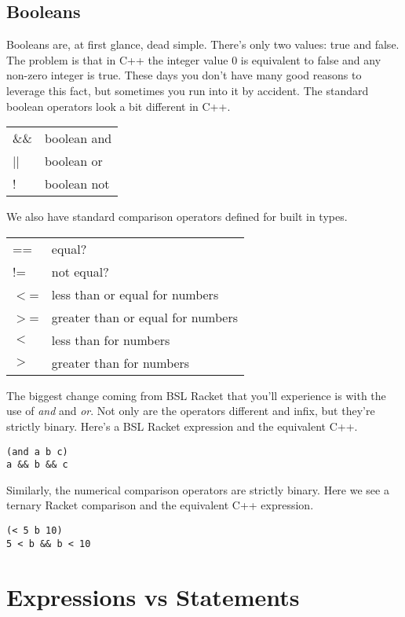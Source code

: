 \documentclass[]{tufte-handout}
\begin{document}
\subsection{Booleans}

Booleans are, at first glance, dead simple. There's only two values: true and false.  The problem is that in C++ the integer value 0 is equivalent to false and any non-zero integer is true.  These days you don't have many good reasons to leverage this fact, but sometimes you run into it by accident. The standard boolean operators look a bit different in C++.

\begin{center}
\begin{tabular}{ll}
\&\& & boolean and \\
|| & boolean or \\
! & boolean not \\
\end{tabular}
\end{center}


We also have standard comparison operators defined for built in types. 

\begin{center}
\begin{tabular}{ll}
== & equal? \\
!= & not equal? \\
$<$= & less than or equal for numbers \\
$>$= & greater than or equal for numbers \\
$<$ & less than for numbers \\
$>$ & greater than for numbers
\end{tabular}
\end{center}

The biggest change coming from BSL Racket that you'll experience is with the use of \textit{and} and \textit{or}.  Not only are the operators different and infix, but they're strictly binary.  Here's a BSL Racket expression and the equivalent C++. 
\begin{verbatim}
(and a b c) 
a && b && c 
\end{verbatim}
Similarly, the numerical comparison operators are strictly binary. Here we see a ternary Racket comparison and the equivalent C++ expression.
\begin{verbatim}
(< 5 b 10)
5 < b && b < 10
\end{verbatim}

\section{Expressions vs Statements}
\end{document}
